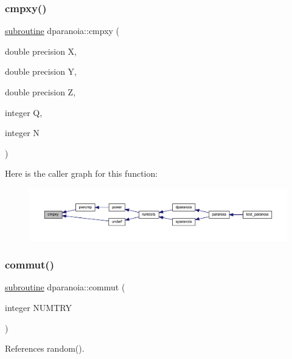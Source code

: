 \subsubsection{\texorpdfstring{cmpxy()}{cmpxy()}}
{\footnotesize\ttfamily \hyperlink{M__stopwatch_83_8txt_acfbcff50169d691ff02d4a123ed70482}{subroutine} dparanoia\+::cmpxy (\begin{DoxyParamCaption}\item[{double precision}]{X,  }\item[{double precision}]{Y,  }\item[{double precision}]{Z,  }\item[{integer}]{Q,  }\item[{integer}]{N }\end{DoxyParamCaption})}

Here is the caller graph for this function\+:
\nopagebreak
\begin{figure}[H]
\begin{center}
\leavevmode
\includegraphics[width=350pt]{dparanoia_8f90_a143ab8d599568d2afcca2aa81370b990_icgraph}
\end{center}
\end{figure}
\mbox{\label{dparanoia_8f90_ae7890d0a663dc609947497ee29d7b921}} 
\subsubsection{\texorpdfstring{commut()}{commut()}}
{\footnotesize\ttfamily \hyperlink{M__stopwatch_83_8txt_acfbcff50169d691ff02d4a123ed70482}{subroutine} dparanoia\+::commut (\begin{DoxyParamCaption}\item[{integer}]{N\+U\+M\+T\+RY }\end{DoxyParamCaption})}



References random().

